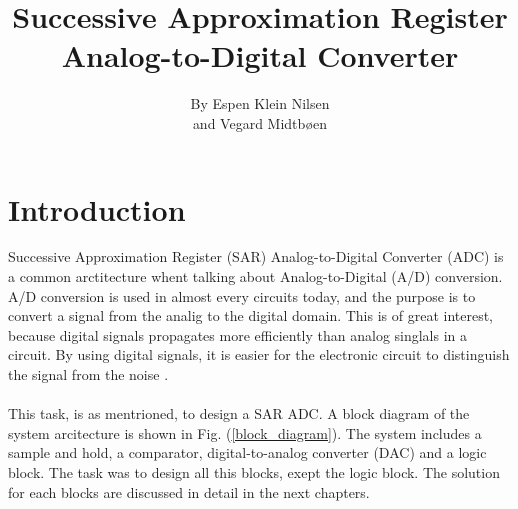 \documentclass[english, 12pt, a4paper]{article}
\title{ \huge{Successive Approximation Register Analog-to-Digital Converter}}
\author{By Espen Klein Nilsen\\ and Vegard Midtbøen}
\begin{document}
\ififorside{}
\maketitle{} \newpage

\tableofcontents{} \newpage
\listoffigures{} 
\listoftables{} \newpage



\section{Introduction} 
Successive Approximation Register (SAR) Analog-to-Digital Converter (ADC) is a common arctitecture whent talking about Analog-to-Digital (A/D) conversion. A/D conversion is used in almost every
circuits today, and the purpose is to convert a signal from the analig to the digital domain. This is of great interest, because digital signals propagates more efficiently than analog singlals in a 
circuit. By using digital signals, it is easier for the electronic circuit to distinguish the signal from the noise \cite{basic-adc}.\\
\\
This task, is as mentrioned, to design a SAR ADC. A block diagram of the system arcitecture is shown in Fig. (\ref{block_diagram}). The system includes a sample and hold, a comparator, digital-to-analog 
converter (DAC) and a logic block. The task was to design all this blocks, exept the logic block. The solution for each blocks are discussed in detail in the next chapters.  
\end{document}
